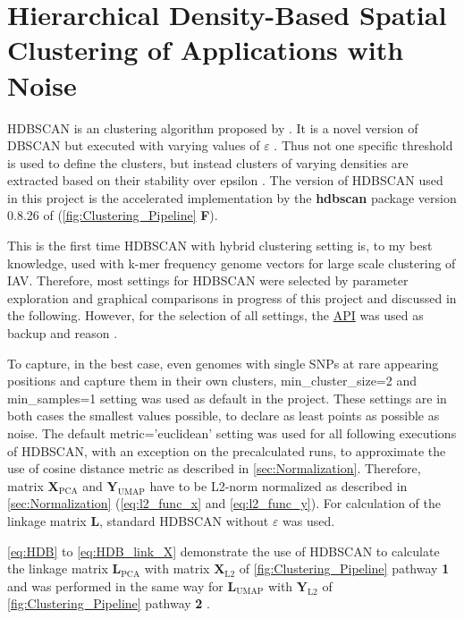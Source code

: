 \section{Hierarchical Density-Based Spatial Clustering of Applications with Noise} \label{sec:HDBSCAN}

\gls{HDBSCAN} is an clustering algorithm proposed by \textcite{campello_hierarchical_2015, hutchison_density-based_2013}. It is a novel version of \gls{DBSCAN} but executed with varying values of $\varepsilon$ \autocite{hutchison_density-based_2013}. Thus not one specific threshold is used to define the clusters, but instead clusters of varying densities are extracted based on their stability over epsilon \autocite{mcinnes_hdbscan_2017}. The version of \gls{HDBSCAN} used in this project is the accelerated implementation by the \textbf{hdbscan} package version 0.8.26 of \textcite{mcinnes_accelerated_2017} (\autoref{fig:Clustering_Pipeline} \textsf{\textbf{F}}).

This is the first time \gls{HDBSCAN} with hybrid clustering setting is, to my best knowledge, used with k-mer frequency genome vectors for large scale clustering of \gls{IAV}. Therefore, most settings for \gls{HDBSCAN} were selected by parameter exploration and graphical comparisons in progress of this project and discussed in the following. However, for the selection of all settings, the \href{https://hdbscan.readthedocs.io/en/latest/api.html}{API} was used as backup and reason \autocite{mcinnes_hdbscan_2017}. 

To capture, in the best case, even genomes with single \glspl{SNP} at rare appearing positions and capture them in their own clusters, \colorbox{backcolour}{min\_cluster\_size=2} and \colorbox{backcolour}{min\_samples=1} setting was used as default in the project. These settings are in both cases the smallest values possible, to declare as least points as possible as noise. The default \colorbox{backcolour}{metric='euclidean'} setting was used for all following executions of \gls{HDBSCAN}, with an exception on the precalculated runs, to approximate the use of cosine distance metric as described in \autoref{sec:Normalization}. Therefore, matrix $\mathbf{X}_{\text{PCA}}$ and $\mathbf{Y}_{\text{UMAP}}$ have to be L2-norm normalized as described in \autoref{sec:Normalization} (\autoref{eq:l2_func_x} and \autoref{eq:l2_func_y}). For calculation of the linkage matrix $\mathbf{L}$, standard \gls{HDBSCAN} without $\varepsilon$ was used.

\autoref{eq:HDB} to \autoref{eq:HDB_link_X} demonstrate the use of \gls{HDBSCAN} to calculate the linkage matrix $\mathbf{L}_{\text{PCA}}$ with matrix $\mathbf{X}_{\text{L2}}$ of \autoref{fig:Clustering_Pipeline} pathway \textsf{\textbf{1}} and was performed in the same way for $\mathbf{L}_{\text{UMAP}}$ with $\mathbf{Y}_{\text{L2}}$ of \autoref{fig:Clustering_Pipeline} pathway \textsf{\textbf{2}} \autocite{gower_minimum_1969, mcinnes_hdbscan_2017}.

